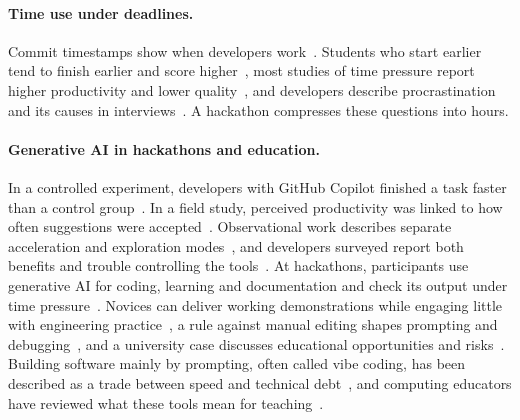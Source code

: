 \documentclass{article}
\begin{document}
\paragraph{Time use under deadlines.}
Commit timestamps show when developers work~\cite{claes2018night}. Students who start earlier tend to finish earlier and score higher~\cite{edwards2009behaviors,kazerouni2017procrastination}, most studies of time pressure report higher productivity and lower quality~\cite{kuutila2020timepressure}, and developers describe procrastination and its causes in interviews~\cite{saghi2025procrastination}. A hackathon compresses these questions into hours.

\paragraph{Generative AI in hackathons and education.}
In a controlled experiment, developers with GitHub Copilot finished a task faster than a control group~\cite{peng2023copilot}. In a field study, perceived productivity was linked to how often suggestions were accepted~\cite{ziegler2024copilot}. Observational work describes separate acceleration and exploration modes~\cite{barke2023grounded}, and developers surveyed report both benefits and trouble controlling the tools~\cite{liang2024usability}. At hackathons, participants use generative AI for coding, learning and documentation and check its output under time pressure~\cite{zhou2026quickbuild}. Novices can deliver working demonstrations while engaging little with engineering practice~\cite{gama2025vibes}, a rule against manual editing shapes prompting and debugging~\cite{chen2026codeforall}, and a university case discusses educational opportunities and risks~\cite{sajja2024genaihack}. Building software mainly by prompting, often called vibe coding, has been described as a trade between speed and technical debt~\cite{waseem2025vibepractice}, and computing educators have reviewed what these tools mean for teaching~\cite{prather2023robots,denny2024computinged}.
\end{document}
